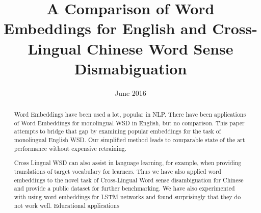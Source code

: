 \documentclass[11pt]{article}
\title{A Comparison of Word Embeddings for English and Cross-Lingual Chinese Word Sense Dismabiguation}
\date{June 2016}
\begin{document}
\maketitle
  

\begin{abstract}
Word Embeddings have been used a lot, popular in NLP. 
There have been applications of Word Embeddings for monolingual WSD in English, but no comparison.
This paper attempts to bridge that gap by examining popular embeddings for the task of monolingual English WSD. 
Our simplified method leads to comparable state of the art performance without expensive retraining. 


Cross Lingual WSD can also assist in language learning, for example, when providing translations of target vocabulary for learners. 
Thus we have also applied word embeddings to the novel task of Cross-Lingual Word sense disambiguation for Chinese and provide a public dataset for further benchmarking.
We have also experimented with using word embeddings for LSTM networks and found surprisingly that they do not work well.
Educational applications

\end{abstract}
\end{document}
